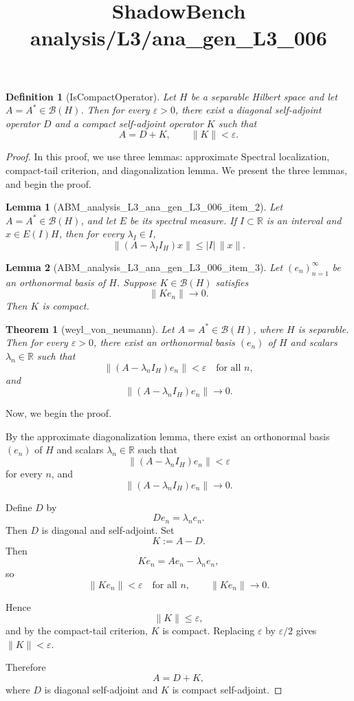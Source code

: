 \documentclass{article}
\title{ShadowBench analysis/L3/ana\_gen\_L3\_006}
\newtheorem{theorem}{Theorem}
\newtheorem{lemma}{Lemma}
\newtheorem{definition}{Definition}
\begin{document}
\maketitle

\begin{definition}[IsCompactOperator]
Let \(H\) be a separable Hilbert space and let \(A=A^*\in\mathcal B(H)\).
Then for every \(\varepsilon>0\), there exist a diagonal self-adjoint operator
\(D\) and a compact self-adjoint operator \(K\) such that
\[
A=D+K,
\qquad
\|K\|<\varepsilon.
\]
\end{definition}

\begin{proof}
In this proof, we use three lemmas: approximate Spectral localization, compact-tail criterion, and diagonalization lemma. We present the three lemmas, and begin the proof. 



\begin{lemma}[ABM_analysis_L3_ana_gen_L3_006_item_2]
Let \(A=A^*\in\mathcal B(H)\), and let \(E\) be its spectral measure.
If \(I\subset\mathbb R\) is an interval and \(x\in E(I)H\), then for every
\(\lambda_I\in I\),
\[
\|(A-\lambda_I I_H)x\|
\le |I|\,\|x\|.
\]
\end{lemma}



\begin{lemma}[ABM_analysis_L3_ana_gen_L3_006_item_3]
Let \((e_n)_{n=1}^\infty\) be an orthonormal basis of \(H\). Suppose
\(K\in\mathcal B(H)\) satisfies
\[
\|K e_n\|\to 0.
\]
Then \(K\) is compact.
\end{lemma}



\begin{theorem}[weyl_von_neumann]
Let \(A=A^*\in\mathcal B(H)\), where \(H\) is separable. Then for every
\(\varepsilon>0\), there exist an orthonormal basis \((e_n)\) of \(H\) and
scalars \(\lambda_n\in\mathbb R\) such that
\[
\|(A-\lambda_n I_H)e_n\|<\varepsilon
\quad\text{for all }n,
\]
and
\[
\|(A-\lambda_n I_H)e_n\|\to 0.
\]
\end{theorem}

Now, we begin the proof. 

By the approximate diagonalization lemma, there exist an orthonormal basis
\((e_n)\) of \(H\) and scalars \(\lambda_n\in\mathbb R\) such that
\[
\|(A-\lambda_n I_H)e_n\|<\varepsilon
\]
for every \(n\), and
\[
\|(A-\lambda_n I_H)e_n\|\to 0.
\]

Define \(D\) by
\[
De_n=\lambda_n e_n.
\]
Then \(D\) is diagonal and self-adjoint. Set
\[
K:=A-D.
\]
Then
\[
Ke_n=Ae_n-\lambda_n e_n,
\]
so
\[
\|Ke_n\|<\varepsilon
\quad\text{for all }n,
\qquad
\|Ke_n\|\to 0.
\]

Hence
\[
\|K\|\le \varepsilon,
\]
and by the compact-tail criterion, \(K\) is compact. Replacing \(\varepsilon\)
by \(\varepsilon/2\) gives \(\|K\|<\varepsilon\).

Therefore
\[
A=D+K,
\]
where \(D\) is diagonal self-adjoint and \(K\) is compact self-adjoint.
\end{proof}
\end{document}
